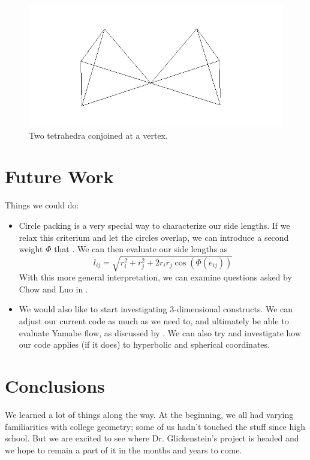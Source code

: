 \documentclass[12pt]{article}
\begin{document}
\begin{figure}
\includegraphics{tetratouch.png}
\caption{Two tetrahedra conjoined at a vertex.}
\label{fig:tt}
\end{figure}

\newpage
\section{Future Work}
\maketitle
  Things we could do:
  \begin{itemize}

  \item Circle packing is a very special way to characterize our side lengths. If we relax this criterium and let the circles overlap, we can introduce a second weight $\Phi$ that . We can then evaluate our side lengths as $$l_{ij} = \sqrt{r_i^2 + r_j^2 + 2r_ir_j\cos(\Phi(e_{ij}))}$$ With this more general interpretation, we can examine questions asked by Chow and Luo in \cite{chowluo}.  
  
  \item We would also like to start investigating 3-dimensional constructs. We can adjust our current code as much as we need to, and ultimately be able to evaluate Yamabe flow, as discussed by \cite{DrG}. We can also try and investigate how our code applies (if it does) to hyperbolic and spherical coordinates. 
  \end{itemize} 
  
  \newpage
  \section{Conclusions}
  We learned a lot of things along the way. At the beginning, we all had varying familiarities with college geometry; some of us hadn't touched the stuff since high school. But we are excited to see where Dr. Glickenstein's project is headed and we hope to remain a part of it in the months and years to come.\newline
  
\end{document}
